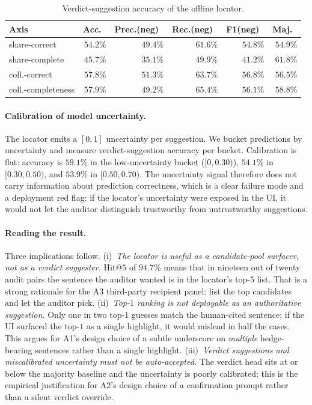 \documentclass[11pt,a4paper]{article}
\begin{document}
\begin{table}[t]
\centering\small
\caption{Verdict-suggestion accuracy of the offline locator.}
\label{tab:verd-tool}
\begin{tabular}{lrrrrr}
\toprule
Axis & Acc.\ & Prec.(neg)\ & Rec.(neg)\ & F1(neg)\ & Maj.\ \\
\midrule
share-correct      & $54.2\%$ & $49.4\%$ & $61.6\%$ & $54.8\%$ & $54.9\%$ \\
share-complete     & $45.7\%$ & $35.1\%$ & $49.9\%$ & $41.2\%$ & $61.8\%$ \\
coll.-correct      & $57.8\%$ & $51.3\%$ & $63.7\%$ & $56.8\%$ & $56.5\%$ \\
coll.-completeness & $57.9\%$ & $49.2\%$ & $65.4\%$ & $56.1\%$ & $58.8\%$ \\
\bottomrule
\end{tabular}
\end{table}

\paragraph{Calibration of model uncertainty.}
The locator emits a $[0,1]$ uncertainty per suggestion. We bucket
predictions by uncertainty and measure verdict-suggestion accuracy
per bucket. Calibration is flat: accuracy is $59.1\%$ in the
low-uncertainty bucket ($[0,0.30)$), $54.1\%$ in $[0.30,0.50)$, and
$53.9\%$ in $[0.50,0.70)$. The uncertainty signal therefore does not
carry information about prediction correctness, which is a clear
failure mode and a deployment red flag: if the locator's uncertainty
were exposed in the UI, it would not let the auditor distinguish
trustworthy from untrustworthy suggestions.

\paragraph{Reading the result.}
Three implications follow. (i)~\emph{The locator is useful as a
candidate-pool surfacer, not as a verdict suggester.} Hit@$5$ of
$94.7\%$ means that in nineteen out of twenty audit pairs the
sentence the auditor wanted is in the locator's top-$5$ list. That
is a strong rationale for the A3 third-party recipient panel: list
the top candidates and let the auditor pick.
(ii)~\emph{Top-$1$ ranking is not deployable as an authoritative
suggestion.} Only one in two top-$1$ guesses match the human-cited
sentence; if the UI surfaced the top-$1$ as a single highlight, it
would mislead in half the cases. This argues for A1's design choice
of a subtle underscore on \emph{multiple} hedge-bearing sentences
rather than a single highlight.
(iii)~\emph{Verdict suggestions and miscalibrated uncertainty must
not be auto-accepted.} The verdict head sits at or below the
majority baseline and the uncertainty is poorly calibrated; this is
the empirical justification for A2's design choice of a
confirmation prompt rather than a silent verdict override.
\end{document}
